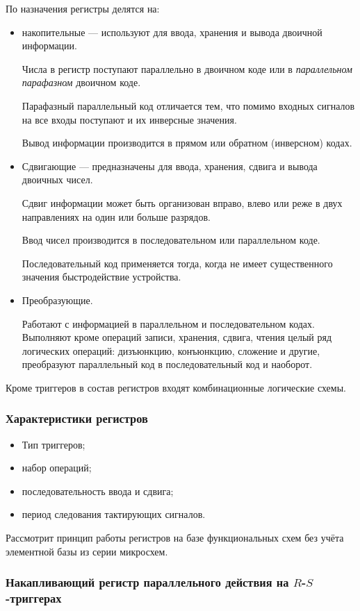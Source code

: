 \documentclass[10pt,a4paper,titlepage]{article}
\begin{document}
По назначения регистры делятся на:
\begin{itemize}
\item накопительные --- используют для ввода, хранения и вывода двоичной информации.

Числа в регистр поступают параллельно в двоичном коде или в \textit{параллельном парафазном} двоичном коде.

Парафазный параллельный код отличается тем, что помимо входных сигналов на все входы поступают и их инверсные значения.

Вывод информации производится в прямом или обратном (инверсном) кодах.
\item Сдвигающие --- предназначены для ввода, хранения, сдвига и вывода двоичных чисел.

Сдвиг информации может быть организован вправо, влево или реже в двух направлениях на один или больше разрядов.

Ввод чисел производится в последовательном или параллельном коде.

Последовательный код применяется тогда, когда не имеет существенного значения быстродействие устройства.
\item Преобразующие.

Работают с информацией в параллельном и последовательном кодах.
Выполняют кроме операций записи, хранения, сдвига, чтения целый ряд логических операций: дизъюнкцию, конъюнкцию, сложение и другие, преобразуют параллельный код в последовательный код и наоборот.
\end{itemize}

Кроме триггеров в состав регистров входят комбинационные логические схемы.

\subsubsection{Характеристики регистров}
\begin{itemize}
\item Тип триггеров;
\item набор операций;
\item последовательность ввода и сдвига;
\item период следования тактирующих сигналов.
\end{itemize}

Рассмотрит принцип работы регистров на базе функциональных схем без учёта элементной базы из серии микросхем.

\subsubsection{Накапливающий регистр параллельного действия на $R$-$S$-триггерах}
\end{document}
